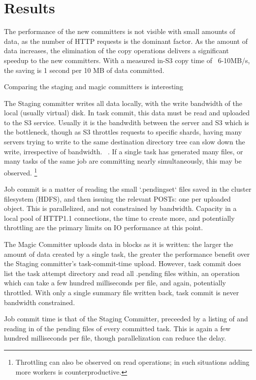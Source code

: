 \documentclass[conference]{IEEEtran}
\begin{document}
\section{Results}
\label{sec:results}


The performance of the new committers is not visible with small amounts
of data, as the number of HTTP requests is the dominant factor.
As the amount of data increases, the elimination of the copy operations
delivers a significant speedup to the new committers.
With a measured in-S3 copy time of ~6-10MB/s, the saving is 1 second per 10 MB
of data committed.

Comparing the staging and magic committers is interesting

The Staging committer writes all data locally, with the write bandwidth
of the local (usually virtual) disk.
In task commit, this data must be read and uploaded to the S3 service.
Usually it is the bandwdith between the server and S3 which is the bottleneck,
though as S3 throttles requests to specific shards, having many servers trying
to write to the same destination directory tree can slow down the write, irrespective
of bandwidth.
\ \cite{AWS-S3-throttling}.
If a single task has generated many files, or many tasks of the same job are
committing nearly simultaneously, this may be observed.
\footnote{Throttling can also be observed on read operations;
in such situations adding more workers is counterproductive.}

Job commit is a matter of reading the small `.pendingset` files saved in the
cluster filesystem (HDFS), and then issuing the relevant POSTs: one per uploaded
object.
This is parallelized, and not constrained by bandwidth.
Capacity in a local pool of HTTP1.1 connections, the time to create more,
and potentially throttling are the primary limits on IO performance at this point.

The Magic Committer uploads data in blocks as it is written: the larger
the amount of data created by a single task, the greater the performance
benefit over the Staging committer's task-commit-time upload.
However, task commit does list the task attempt directory and read all .pending
files within, an operation which can take a few hundred milliseconds per file,
and again, potentially throttled.
With only a single summary file written back, task commit is never
bandwidth constrained.

Job commit time is that of the Staging Committer, preceeded by a listing
of and reading in of the pending files of every committed task.
This is again a few hundred milliseconds per file, though parallelization
can reduce the delay.
\end{document}
